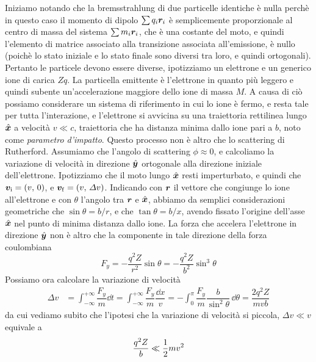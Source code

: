 Iniziamo notando che la bremsstrahlung di due particelle identiche è nulla perchè in questo caso il momento di dipolo $\sum q_i \V{r}_i$  è semplicemente proporzionale al centro di massa del sistema $\sum m_i \V{r}_i$, che è una costante del moto, e quindi l'elemento di matrice associato alla transizione associata all'emissione, è nullo (poichè lo stato iniziale e lo stato finale sono diversi tra loro, e quindi ortogonali). Pertanto le particele devono essere diverse, ipotizziamo un elettrone e un generico ione di carica $Zq$. La particella emittente è l'elettrone in quanto più leggero e quindi subente un'accelerazione maggiore dello ione di massa $M$. A causa di ciò possiamo considerare un sistema di riferimento in cui lo ione è fermo, e resta tale per tutta l'interazione, e l'elettrone si avvicina su una traiettoria rettilinea lungo $\vers{x}$ a velocità $v\ll c$, traiettoria che ha distanza minima dallo ione pari a $b$, noto come \textit{parametro d'impatto}. Questo processo non è altro che lo scattering di Rutherford. Assumiamo che l'angolo di scattering $\phi \approx 0$, e calcoliamo la variazione di velocità in direzione $\vers{y}$ ortogonale alla direzione iniziale dell'elettrone. Ipotizziamo che il moto lungo $\vers{x}$ resti imperturbato, e quindi che $\V{v}_\mathrm{i} = (v,\,0)$, e $\V{v}_\mathrm{f} = (v,\,\Delta v)$. Indicando con $\V{r}$ il vettore che congiunge lo ione all'elettrone e con $\theta$ l'angolo tra $\V{r}$ e $\vers{x}$, abbiamo da semplici considerazioni geometriche che $\sin\theta = b/r$, e che $\tan\theta = b/x$, avendo fissato l'origine dell'asse $\vers{x}$ nel punto di minima distanza dallo ione. La forza che accelera l'elettrone in direzione $\vers{y}$ non è altro che la componente in tale direzione della forza coulombiana
\begin{equation}
F_y = -\dfrac{q^2Z}{r^2}\sin\theta = - \dfrac{q^2Z}{b^2}\sin^3\theta 
\end{equation}
Possiamo ora calcolare la variazione di velocità
\begin{align}
\Delta v &=  \int_{-\infty}^{+\infty} \dfrac{F_y}{m} \dd t = \int_{-\infty}^{+\infty} \dfrac{F_y}{m} \dfrac{\dd x}{v} = -\int_{0}^{\pi} \dfrac{F_y}{m} \dfrac{b}{\sin^2\theta}\, \dd \theta = \dfrac{2 q^2 Z}{m v b} \label{eq:Bremss3}
\end{align}
da cui vediamo subito che l'ipotesi che la variazione di velocità si piccola, $\Delta v \ll v$ equivale a 
\begin{equation}
\dfrac{q^2 Z}{b} \ll \dfrac{1}{2}mv^2 \label{eq:Bremss6}
\end{equation}
